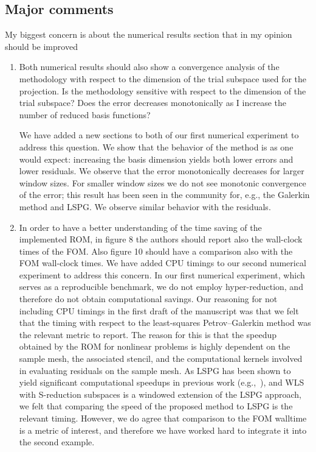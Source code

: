 \documentclass[3p,computermodern,10pt]{elsarticle}
\begin{document}
\subsection{Major comments}
My biggest concern is about the numerical results section that in my opinion should be improved
\begin{enumerate}
\item Both numerical results should also show a convergence analysis of the methodology with respect to the dimension of the trial subspace used for the projection. Is the methodology sensitive with respect to the dimension of the trial subspace? Does the error decreases monotonically as I increase the number of reduced basis functions?

{\color{red} We have added a new sections to both of our first numerical experiment to address this question. We show that the behavior of the method is as one would expect: increasing the basis dimension yields both lower errors and lower residuals. We observe that the error monotonically decreases for larger window sizes. For smaller window sizes we do not see monotonic convergence of the error; this result has been seen in the community for, e.g., the Galerkin method and LSPG. We observe similar behavior with the residuals.} 

\item In order to have a better understanding of the time saving of the implemented ROM, in figure 8 the authors should report also the wall-clock times of the FOM. Also figure 10 should have a comparison also with the FOM wall-clock times.
{\color{red} We have added CPU timings to our second numerical experiment to address this concern. In our first numerical experiment, which serves as a reproducible benchmark, we do not employ hyper-reduction, and therefore do not obtain computational savings. Our reasoning for not including CPU timings in the first draft of the manuscript was that we felt that the timing with respect to the least-squares Petrov--Galerkin method was the relevant metric to report. The reason for this is that the speedup obtained by the ROM for nonlinear problems is highly dependent on the sample mesh, the associated stencil, and the computational kernels involved in evaluating residuals on the sample mesh. As LSPG has been shown to yield significant computational speedups in previous work (e.g.,~\cite{carlberg_lspg_v_galerkin}), and WLS with S-reduction subspaces is a windowed extension of the LSPG approach, we felt that comparing the speed of the proposed method to LSPG is the relevant timing. However, we do agree that comparison to the FOM walltime is a metric of interest, and therefore we have worked hard to integrate it into the second example.}


\end{enumerate}
\end{document}
